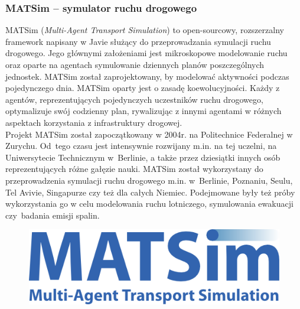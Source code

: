 \subsubsection{MATSim -- symulator ruchu drogowego}
MATSim (\textit{Multi-Agent Transport Simulation}) to open-sourcowy, rozszerzalny framework napisany w Javie służący do przeprowadzania symulacji ruchu drogowego. Jego głównymi założeniami jest mikroskopowe modelowanie ruchu oraz oparte na agentach symulowanie dziennych planów poszczególnych jednostek. MATSim został zaprojektowany, by modelować aktywności podczas pojedynczego dnia. MATSim oparty jest o zasadę koewolucyjności. Każdy z agentów, reprezentujących pojedynczych uczestników ruchu drogowego, optymalizuje swój codzienny plan, rywalizując z innymi agentami w różnych aspektach korzystania z infrastruktury drogowej.\\
Projekt MATSim został zapoczątkowany w 2004r. na Politechnice Federalnej w Zurychu.\cite{matsim} Od~tego czasu jest intensywnie rozwijany m.in. na tej uczelni, na Uniwersytecie Technicznym w~Berlinie, a także przez dziesiątki innych osób reprezentujących różne gałęzie nauki. MATSim został wykorzystany do przeprowadzenia symulacji ruchu drogowego m.in. w~Berlinie, Poznaniu, Seulu, Tel Avivie, Singapurze czy też dla całych Niemiec. Podejmowane były też próby wykorzystania go w celu modelowania ruchu lotniczego, symulowania ewakuacji czy~badania emisji spalin.
    \begin{figure}[h]
        \includegraphics[width=\textwidth]{images/mopsim/matsim_logo.png}
    \end{figure}
